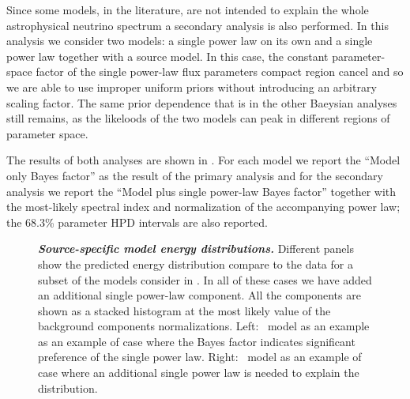 Since some models, in the literature, are not intended to explain the whole astrophysical neutrino spectrum a secondary analysis is also performed.
In this analysis we consider two models: a single power law on its own and a single power law together with a source model.
In this case, the constant parameter-space factor of the single power-law flux parameters compact region cancel and so we are able to use improper uniform priors without introducing an arbitrary scaling factor.
The same prior dependence that is in the other Baeysian analyses still remains, as the likeloods of the two models can peak in different regions of parameter space.

The results of both analyses are shown in .
For each model we report the ``Model only Bayes factor'' as the result of the primary analysis and for the secondary analysis we report the ``Model plus single power-law Bayes factor'' together with the most-likely spectral index and normalization of the accompanying power law; the 68.3\% parameter HPD intervals are also reported.

\begin{figure}
	\centering
	\internallinenumbers
	\caption{\textbf{\textit{Source-specific model energy distributions.}}
		Different panels show the predicted energy distribution compare to the data for a subset of the models consider in .
		In all of these cases we have added an additional single power-law component.
		All the components are shown as a stacked histogram at the most likely value of the background components normalizations.
		Left: \Stecker~model as an example as an example of case where the Bayes factor indicates significant preference of the single power law.
		Right: \KimuraBFour~model as an example of case where an additional single power law is needed to explain the distribution.}\label{fig:source_models}
\end{figure}

